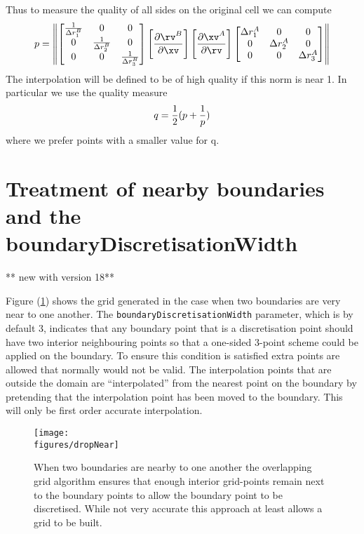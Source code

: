 Thus to measure the quality of all sides on the original cell we can compute
\[
   p = 
   \left\| \begin{bmatrix} {1\over\Delta r_1^B} & 0 & 0 \\
                          0 & {1\over\Delta r_2^B} & 0  \\
                          0 & 0 & {1\over\Delta r_3^B}  \end{bmatrix} 
   \left[ {\partial \rv^B \over \partial \xv} \right]
   \left[ {\partial \xv^A \over \partial \rv }  \right]
          \begin{bmatrix} {\Delta r_1^A} & 0 & 0 \\
                          0 & {\Delta r_2^A} & 0  \\
                          0 & 0 & {\Delta r_3^A}  \end{bmatrix}  \right\|
\]
The interpolation will be defined to be of high quality if this norm is near 1.
In particular we use the quality measure
\[
    q = {1\over2}( p + {1\over p } )
\]
where we prefer points with a smaller value for q.

\clearpage
\section{Treatment of nearby boundaries and the boundaryDiscretisationWidth} 

** new with version 18**

Figure (\ref{fig:nearby}) shows the grid generated in the case when two boundaries are
very near to one another. The {\tt boundaryDiscretisationWidth} parameter, which is by default 3,
indicates that any boundary point that is a discretisation point should have two interior
neighbouring points so that a one-sided 3-point scheme could be applied on the boundary.
To ensure this condition is satisfied extra points are allowed that normally would not be valid.
The interpolation points that are outside the domain are ``interpolated'' from the nearest point
on the boundary by pretending that the interpolation point has been moved to the boundary. This 
will only be first order accurate interpolation. 

\begin{figure}[hbt]
\begin{center}
   \texttt{[image: \\figures/dropNear]}
\end{center}
\caption{When two boundaries are nearby to one another the overlapping grid algorithm
   ensures that enough interior grid-points remain next to the boundary points
   to allow the boundary point to be discretised. While not very accurate this approach
   at least allows a grid to be built.} \label{fig:nearby}
\end{figure}

